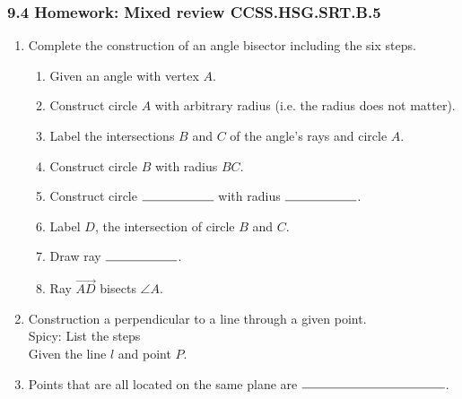 

\fancyhead[LE]{\thepage}



\subsubsection*{9.4 Homework: Mixed review \hfill CCSS.HSG.SRT.B.5}
\begin{enumerate}
  \item Complete the construction of an angle bisector including the six steps.
  \begin{enumerate}
    \item Given an angle with vertex $A$.
    \item Construct circle $A$ with arbitrary radius (i.e. the radius does not matter).
    \item Label the intersections $B$ and $C$ of the angle's rays and circle $A$.
    \item Construct circle $B$  with radius $BC$. \bigskip
    \item Construct circle $\rule{2cm}{0.15mm}$  with radius $\rule{2cm}{0.15mm}$. \bigskip
    \item Label $D$, the intersection of circle $B$ and $C$. \bigskip
    \item Draw ray $\rule{2cm}{0.15mm}$.
    \bigskip
    \item Ray $\overrightarrow {AD}$ bisects $\angle A$.
  \end{enumerate}
  \vspace{3cm}
  \begin{center}
  \end{center}
\newpage

\item Construction a perpendicular to a line through a given point.\\
  Spicy: List the steps\\[0.5cm]
  \hspace{1cm} Given the line  $l$ and point $P$.
  \vspace{10cm}
  \begin{center}
  \end{center}
\newpage
\item Points that are all located on the same plane are $\rule{4cm}{0.15mm}$. \bigskip


\end{enumerate}
